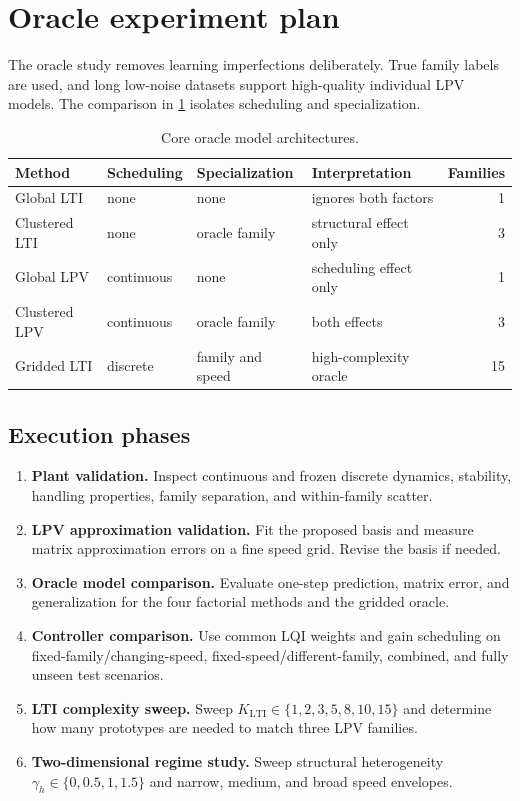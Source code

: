 \section{Oracle experiment plan}
The oracle study removes learning imperfections deliberately. True family labels
are used, and long low-noise datasets support high-quality individual LPV models.
The comparison in \cref{tab:methods} isolates scheduling and specialization.

\begin{table}[ht]
\centering
\caption{Core oracle model architectures.}
\label{tab:methods}
\begin{tabular}{llllr}
\toprule
Method & Scheduling & Specialization & Interpretation & Families\\
\midrule
Global LTI & none & none & ignores both factors & 1\\
Clustered LTI & none & oracle family & structural effect only & 3\\
Global LPV & continuous & none & scheduling effect only & 1\\
Clustered LPV & continuous & oracle family & both effects & 3\\
Gridded LTI & discrete & family and speed & high-complexity oracle & 15\\
\bottomrule
\end{tabular}
\end{table}

\subsection{Execution phases}
\begin{enumerate}
\item \textbf{Plant validation.} Inspect continuous and frozen discrete dynamics,
  stability, handling properties, family separation, and within-family scatter.
\item \textbf{LPV approximation validation.} Fit the proposed basis and measure
  matrix approximation errors on a fine speed grid. Revise the basis if needed.
\item \textbf{Oracle model comparison.} Evaluate one-step prediction, matrix error,
  and generalization for the four factorial methods and the gridded oracle.
\item \textbf{Controller comparison.} Use common LQI weights and gain scheduling on
  fixed-family/changing-speed, fixed-speed/different-family, combined, and fully
  unseen test scenarios.
\item \textbf{LTI complexity sweep.} Sweep $K_{\mathrm{LTI}}\in\{1,2,3,5,8,10,15\}$
  and determine how many prototypes are needed to match three LPV families.
\item \textbf{Two-dimensional regime study.} Sweep structural heterogeneity
  $\gamma_h\in\{0,0.5,1,1.5\}$ and narrow, medium, and broad speed envelopes.
\end{enumerate}

